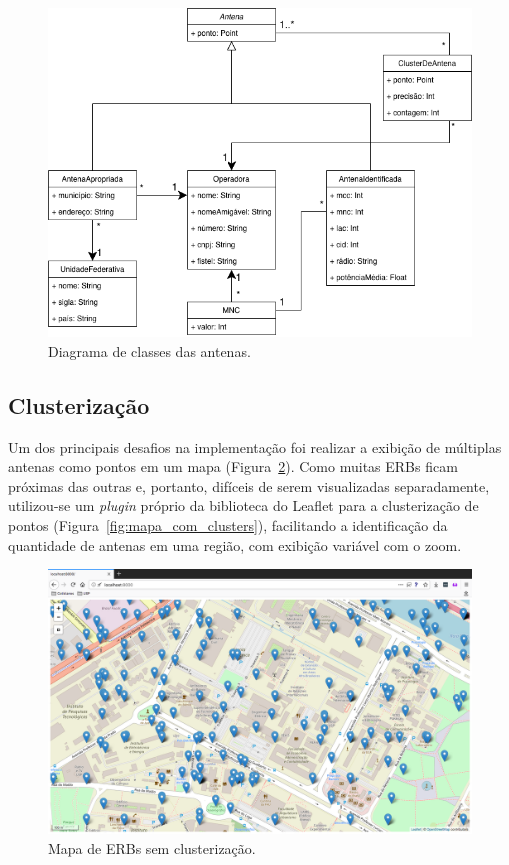 \documentclass[]{politex}
\begin{document}
\begin{figure}[H]
    \centering
    \includegraphics[width=6in]{imagens/diagrama_classes_antenas}
    \caption{Diagrama de classes das antenas.}
    \label{fig:diagrama_classes_antenas}
\end{figure}

\subsection{Clusterização}

Um dos principais desafios na implementação foi realizar a exibição de múltiplas
antenas como pontos em um mapa (Figura~\ref{fig:mapa_sem_clusters}). Como muitas
ERBs ficam próximas das outras e, portanto, difíceis de serem visualizadas
separadamente, utilizou-se um \textit{plugin} próprio da biblioteca do Leaflet
para a clusterização de pontos (Figura~\ref{fig:mapa_com_clusters}), facilitando
a identificação da quantidade de antenas em uma região, com exibição variável
com o zoom.

\begin{figure}[H]
    \centering
    \includegraphics[width=6in]{imagens/mapa_sem_clusters}
    \caption{Mapa de ERBs sem clusterização.}
    \label{fig:mapa_sem_clusters}
\end{figure}
\end{document}
